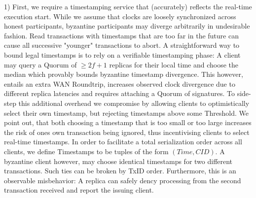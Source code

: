 1) First, we require a timestamping service that (accurately) reflects the real-time execution start. While we assume that clocks are loosely synchronized across honest participants, byzantine participants may diverge arbitrarily in undesirable fashion. Read transactions with timestamps that are too far in the future can cause all successive "younger" transactions to abort. 
A straightforward way to bound legal timestamps is to rely on a verifiable timestamping phase: A client may query a Quorum of $\geq 2f+1$ replicas for their local time and choose the median which provably bounds byzantine timestamp divergence. This however, entails an extra WAN Roundtrip, increases observed clock divergence due to different replica latencies and requires attaching a Quorum of signatures. To side-step this additional overhead we compromise by allowing clients to optimistically select their own timestamp, but rejecting timestamps above some Threshold. We point out, that both choosing a timestamp that is too small or too large increases the risk of ones own transaction being ignored, thus incentivising clients to select real-time timestamps. In order to facilitate a total serialization order across all clients, we define Timestamps to be tuples of the form $(Time, CID)$. A byzantine client however, may choose identical timestamps for two different transactions. Such ties can be broken by TxID order. Furthermore, this is an observable misbehavior: A replica can safely dency processing from the second transaction received and report the issuing client.

